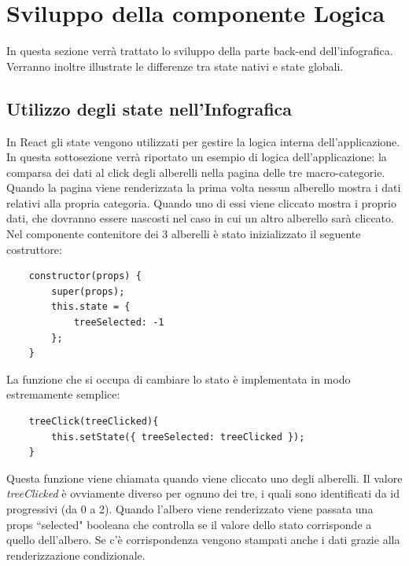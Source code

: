 \section{Sviluppo della componente Logica}
\label{sec:logic}
\noindent In questa sezione verrà trattato lo sviluppo della parte back-end dell'infografica. Verranno inoltre illustrate le differenze tra state nativi e state globali. \newline
\subsection{Utilizzo degli state nell'Infografica}
\noindent In React gli state vengono utilizzati per gestire la logica interna dell'applicazione.\newline
In questa sottosezione verrà riportato un esempio di logica dell'applicazione: la comparsa dei dati al click degli alberelli nella pagina delle tre macro-categorie.\newline
Quando la pagina viene renderizzata la prima volta nessun alberello mostra i dati relativi alla propria categoria. Quando uno di essi viene cliccato mostra i proprio dati, che dovranno essere nascosti nel caso in cui un altro alberello sarà cliccato.\newline
Nel componente contenitore dei 3 alberelli è stato inizializzato il seguente costruttore:
\begin{lstlisting}
    constructor(props) {
        super(props);
        this.state = {
            treeSelected: -1
        };
    }
\end{lstlisting}
\noindent La funzione che si occupa di cambiare lo stato è implementata in modo estremamente semplice:
\begin{lstlisting}
    treeClick(treeClicked){
        this.setState({ treeSelected: treeClicked });
    }
\end{lstlisting}
Questa funzione viene chiamata quando viene cliccato uno degli alberelli. Il valore \textit{treeClicked} è ovviamente diverso per ognuno dei tre, i quali sono identificati da id progressivi (da 0 a 2).\newline
Quando l'albero viene renderizzato viene passata una props ``selected" booleana che controlla se il valore dello stato corrisponde a quello dell'albero.\newline
Se c'è corrispondenza vengono stampati anche i dati grazie alla renderizzazione condizionale.
